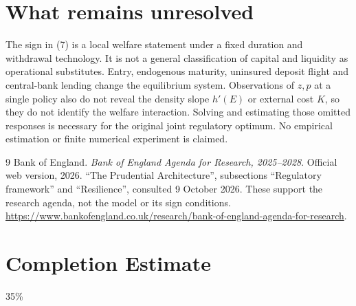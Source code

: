 \documentclass[11pt]{article}
\theoremstyle{remark}
\begin{document}
\section{What remains unresolved}
The sign in (7) is a local welfare statement under a fixed duration and
withdrawal technology. It is not a general classification of capital and
liquidity as operational substitutes. Entry, endogenous maturity, uninsured
deposit flight and central-bank lending change the equilibrium system.
Observations of $z,p$ at a single policy also do not reveal the density
slope $h'(E)$ or external cost $K$, so they do not identify the welfare
interaction. Solving and estimating those omitted responses is necessary
for the original joint regulatory optimum. No empirical estimation or
finite numerical experiment is claimed.

\begin{thebibliography}{9}
 Bank of England. \emph{Bank of England Agenda for Research,
2025--2028}. Official web version, 2026.
``The Prudential Architecture'', subsections ``Regulatory framework'' and
``Resilience'', consulted 9 October 2026. These support the research
agenda, not the model or its sign conditions.
\url{https://www.bankofengland.co.uk/research/bank-of-england-agenda-for-research}.
\end{thebibliography}

\section{Completion Estimate}
35\%
\end{document}
